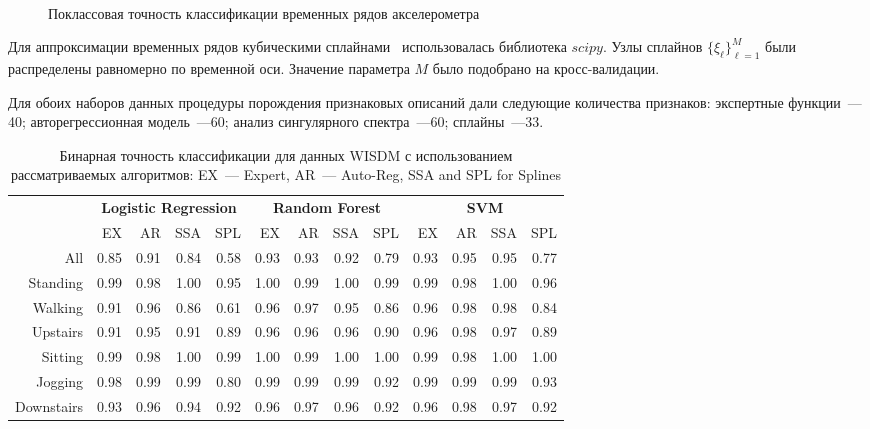 \begin{figure}[!ht]
	\\
	\caption{Поклассовая точность классификации временных рядов акселерометра}
	\label{ch6:fig:feature_union_results}
\end{figure}

Для аппроксимации временных рядов кубическими сплайнами~\cite{deboor1978splines} использовалась библиотека $scipy$. 
Узлы сплайнов $\{\xi_{\ell}\}_{\ell = 1}^M$ были распределены равномерно по временной оси.
Значение параметра $M$ было подобрано на кросс-валидации.

Для обоих наборов данных процедуры порождения признаковых описаний дали следующие количества признаков: экспертные функции~---40; авторегрессионная модель~---60; анализ сингулярного спектра~---60; сплайны~---33.

\begin{table}[!ht]
	\centering
	\caption{Бинарная точность классификации для данных WISDM с использованием рассматриваемых алгоритмов: EX~--- Expert, AR~--- Auto-Reg, SSA and  SPL for Splines}
	\footnotesize
	\begin{tabular}{r|rrrr|rrrr|rrrr|}
		& \multicolumn{4}{c|}{\textbf{Logistic Regression}} & \multicolumn{4}{c|}{\textbf{Random Forest}} & \multicolumn{4}{c|}{\textbf{SVM}}          \\ \cline{2-13} 
		& EX   & AR   & SSA   & SPL  & EX  & AR & SSA & SPL & EX & AR & SSA & SPL \\ \hline
		All& 0.85 & 0.91 & 0.84 & 0.58 & 0.93 & 0.93 & 0.92 & 0.79 & 0.93 & 0.95 & 0.95 & 0.77 \\
		Standing& 0.99 & 0.98 & 1.00 & 0.95 & 1.00 & 0.99 & 1.00 & 0.99 & 0.99 & 0.98 & 1.00 & 0.96 \\
		Walking& 0.91 & 0.96 & 0.86 & 0.61 & 0.96 & 0.97 & 0.95 & 0.86 & 0.96 & 0.98 & 0.98 & 0.84 \\
		Upstairs& 0.91 & 0.95 & 0.91 & 0.89 & 0.96 & 0.96 & 0.96 & 0.90 & 0.96 & 0.98 & 0.97 & 0.89 \\
		Sitting& 0.99 & 0.98 & 1.00 & 0.99 & 1.00 & 0.99 & 1.00 & 1.00 & 0.99 & 0.98 & 1.00 & 1.00 \\
		Jogging& 0.98 & 0.99 & 0.99 & 0.80 & 0.99 & 0.99 & 0.99 & 0.92 & 0.99 & 0.99 & 0.99 & 0.93 \\
		Downstairs& 0.93 & 0.96 & 0.94 & 0.92 & 0.96 & 0.97 & 0.96 & 0.92 & 0.96 & 0.98 & 0.97 & 0.92 \\ \hline
	\end{tabular}
	\label{ch6:tbl:wisdm_methods_results}
\end{table}

